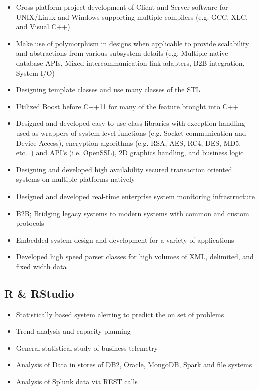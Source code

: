\documentclass[10pt]{report}
\begin{document}
\begin{itemize}
\item Cross platform project development of Client and Server software for UNIX/Linux and Windows supporting multiple compilers (e.g. GCC, XLC, and Visual C++)
\item Make use of polymorphism in designs when applicable to provide scalability and abstractions from various subsystem details (e.g. Multiple native database APIs, Mixed intercommunication link adapters, B2B integration, System I/O)
\item Designing template classes and use many classes of the STL
\item Utilized Boost before C++11 for many of the feature brought into C++
\item Designed and developed easy-to-use class libraries with exception handling used as wrappers of system level functions (e.g. Socket communication and Device Access), encryption algorithms (e.g. RSA, AES, RC4, DES, MD5, etc...) and API’s (i.e. OpenSSL), 2D graphics handling, and business logic 
\item Designing and developed high availability secured transaction oriented systems on multiple platforms natively
\item Designed and developed real-time enterprise system monitoring infrastructure
\item B2B; Bridging legacy systems to modern systems with common and custom protocols
\item Embedded system design and development for a variety of applications
\item Developed high speed parser classes for high volumes of XML, delimited, and fixed width data
\end{itemize}


\subsection*{R \& RStudio}
\begin{itemize}
\item Statistically based system alerting to predict the on set of problems 
\item Trend analysis and capacity planning
\item General statistical study of business telemetry
\item Analysis of Data in stores of DB2, Oracle, MongoDB, Spark and file systems
\item Analysis of Splunk data via REST calls
\end{itemize}
\end{document}
